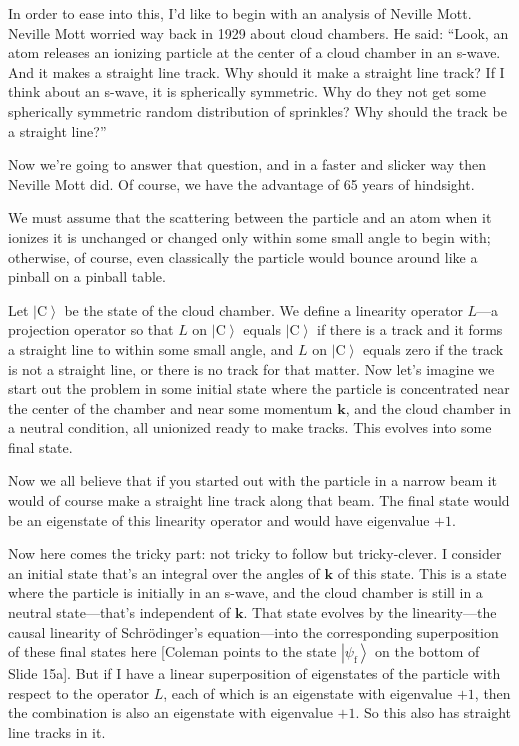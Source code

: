 \documentclass[twocolumn,prb]{revtex4}
\newcommand{\bs}[1]{\boldsymbol{#1}}
\newcommand{\ket}[1]{\left|#1\right\rangle}
\begin{document}
In order to ease into this, I'd like to begin with an analysis of Neville Mott\cite{mott29prsla79}. Neville Mott worried way back in 1929 about cloud chambers. He said: ``Look, an atom releases an ionizing particle at the center of a cloud chamber in an s-wave. And it makes a straight line track. Why should it make a straight line track? If I think about an s-wave, it is spherically symmetric. Why do they not get some spherically symmetric random distribution of sprinkles? Why should the track be a straight line?''

Now we're going to answer that question, and in a faster and slicker way then Neville Mott did. Of course, we have the advantage of 65 years of hindsight.

We must assume that the scattering between the particle and an atom when it ionizes it is unchanged or changed only within some small angle to begin with; otherwise, of course, even classically the particle would bounce around like a pinball on a pinball table.

Let $\ket{\text{C}}$ be the state of the cloud chamber. We define a linearity operator $L$---a projection operator so that
$L$ on $\ket{\text{C}}$ equals $\ket{\text{C}}$
if there is a track and it forms a straight line to within some small angle, and $L$ on $\ket{\text{C}}$ equals zero
if the track is not a straight line, or there is no track for that matter.
Now let's imagine we start out the problem in some initial state where the particle is concentrated near the center of the chamber and near some momentum $\bs{k}$, and the cloud chamber in a neutral condition, all unionized ready to make tracks. This evolves into some final state.

Now we all believe that if you started out with the particle in a narrow beam it would of course make a straight line track along that beam. The final state would be an eigenstate of this linearity operator and would have eigenvalue $+1$.

Now here comes the tricky part: not tricky to follow but tricky-clever. I consider an initial state that's an integral over the angles of $\bs{k}$ of this state. This is a state where the particle is initially in an s-wave, and the cloud chamber is still in a neutral state---that's independent of $\bs{k}$. That state evolves by the linearity---the causal linearity of Schrödinger's equation---into the corresponding superposition of these final states here [Coleman points to the state
$\ket{\psi_{\text{f}}}$ on the bottom of Slide 15a]. But if I have a linear superposition of eigenstates of the particle with respect to the operator $L$, each of which is an eigenstate with eigenvalue $+1$, then the combination is also an eigenstate with eigenvalue $+1$. So this also has straight line tracks in it.
\end{document}
